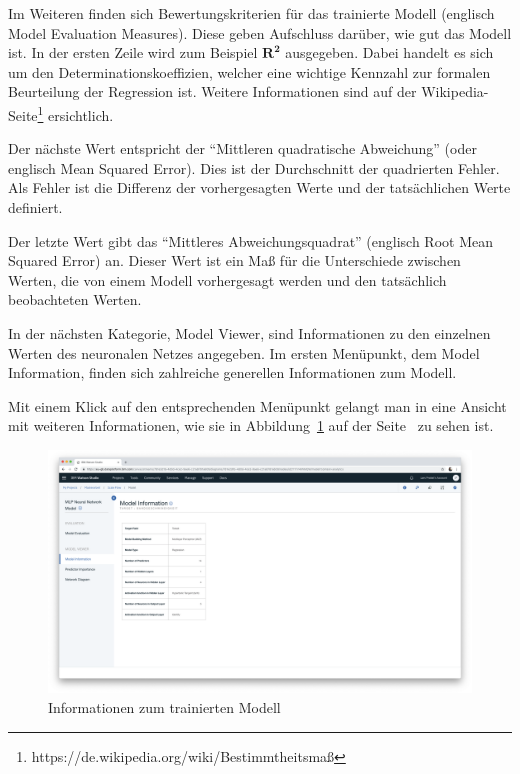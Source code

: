 Im Weiteren finden sich Bewertungskriterien für das trainierte Modell (englisch Model Evaluation Measures). Diese geben
Aufschluss darüber, wie gut das Modell ist. In der ersten Zeile wird zum Beispiel $\mathbf{R^2}$ ausgegeben. Dabei
handelt es sich um den Determinationskoeffizien, welcher eine wichtige Kennzahl zur formalen Beurteilung der
Regression ist. Weitere Informationen sind auf der Wikipedia-Seite\footnote{https://de.wikipedia.org/wiki/Bestimmtheitsmaß}
ersichtlich.

Der nächste Wert entspricht der \enquote{Mittleren quadratische Abweichung} (oder englisch Mean Squared Error). Dies ist
der Durchschnitt der quadrierten Fehler. Als Fehler ist die Differenz der vorhergesagten Werte und der tatsächlichen
Werte definiert.

Der letzte Wert gibt das \enquote{Mittleres Abweichungsquadrat} (englisch Root Mean Squared Error) an. Dieser Wert ist
ein Maß für die Unterschiede zwischen Werten, die von einem Modell vorhergesagt werden und den tatsächlich beobachteten
Werten.

In der nächsten Kategorie, Model Viewer, sind Informationen zu den einzelnen Werten des neuronalen Netzes angegeben.
Im ersten Menüpunkt, dem Model Information, finden sich zahlreiche generellen Informationen zum Modell.

Mit einem Klick auf den entsprechenden Menüpunkt gelangt man in eine Ansicht mit weiteren Informationen, wie sie in
Abbildung~\ref{fig:umsetzung_model_information} auf der Seite~\pageref{fig:umsetzung_model_information} zu sehen ist.

\begin{figure}[h]
    \centering
    \includegraphics[width=\textwidth]{images/kapitel_3/model_information.png}
    \caption{Informationen zum trainierten Modell}
    \label{fig:umsetzung_model_information}
\end{figure}


